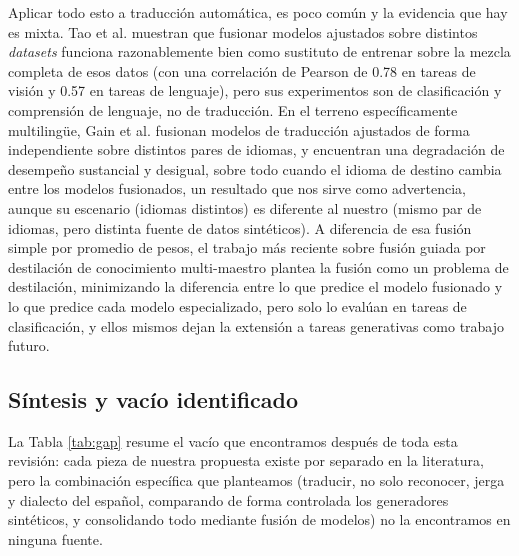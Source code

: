 \documentclass[11pt,a4paper]{article}
\begin{document}
Aplicar todo esto a traducción automática, es poco común y la evidencia que hay es mixta. Tao et al. \cite{tao2025mergemix} muestran que fusionar modelos ajustados sobre distintos \textit{datasets} funciona razonablemente bien como sustituto de entrenar sobre la mezcla completa de esos datos (con una correlación de Pearson de 0.78 en tareas de visión y 0.57 en tareas de lenguaje), pero sus experimentos son de clasificación y comprensión de lenguaje, no de traducción. En el terreno específicamente multilingüe, Gain et al. \cite{gain2026mountdoom} fusionan modelos de traducción ajustados de forma independiente sobre distintos pares de idiomas, y encuentran una degradación de desempeño sustancial y desigual, sobre todo cuando el idioma de destino cambia entre los modelos fusionados, un resultado que nos sirve como advertencia, aunque su escenario (idiomas distintos) es diferente al nuestro (mismo par de idiomas, pero distinta fuente de datos sintéticos). A diferencia de esa fusión simple por promedio de pesos, el trabajo más reciente sobre fusión guiada por destilación de conocimiento multi-maestro \cite{dalili2025multiteacher} plantea la fusión como un problema de destilación, minimizando la diferencia entre lo que predice el modelo fusionado y lo que predice cada modelo especializado, pero solo lo evalúan en tareas de clasificación, y ellos mismos dejan la extensión a tareas generativas como trabajo futuro.

\subsection{Síntesis y vacío identificado}

La Tabla \ref{tab:gap} resume el vacío que encontramos después de toda esta revisión: cada pieza de nuestra propuesta existe por separado en la literatura, pero la combinación específica que planteamos (traducir, no solo reconocer, jerga y dialecto del español, comparando de forma controlada los generadores sintéticos, y consolidando todo mediante fusión de modelos) no la encontramos en ninguna fuente.
\end{document}
